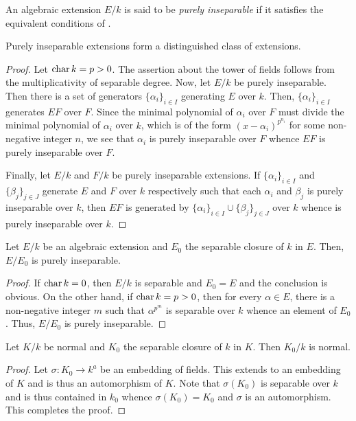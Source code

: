 \begin{definition}
    An algebraic extension $E/k$ is said to be \emph{purely inseparable} if it satisfies the equivalent conditions of .
\end{definition}

\begin{proposition}
    Purely inseparable extensions form a distinguished class of extensions.
\end{proposition}
\begin{proof}
    Let $\operatorname{char} k = p > 0$. The assertion about the tower of fields follows from the multiplicativity of separable degree. Now, let $E/k$ be purely inseparable. Then there is a set of generators $\{\alpha_i\}_{i\in I}$ generating $E$ over $k$. Then, $\{\alpha_i\}_{i\in I}$ generates $EF$ over $F$. Since the minimal polynomial of $\alpha_i$ over $F$ must divide the minimal polynomial of $\alpha_i$ over $k$, which is of the form $(x - \alpha_i)^{p^{n_i}}$ for some non-negative integer $n$, we see that $\alpha_i$ is purely inseparable over $F$ whence $EF$ is purely inseparable over $F$.

    Finally, let $E/k$ and $F/k$ be purely inseparable extensions. If $\{\alpha_i\}_{i\in I}$ and $\{\beta_j\}_{j\in J}$ generate $E$ and $F$ over $k$ respectively such that each $\alpha_i$ and $\beta_j$ is purely inseparable over $k$, then $EF$ is generated by $\{\alpha_i\}_{i\in I}\cup\{\beta_j\}_{j\in J}$ over $k$ whence is purely inseparable over $k$.
\end{proof}

\begin{proposition}
    Let $E/k$ be an algebraic extension and $E_0$ the separable closure of $k$ in $E$. Then, $E/E_0$ is purely inseparable.
\end{proposition}
\begin{proof}
    If $\operatorname{char} k = 0$, then $E/k$ is separable and $E_0 = E$ and the conclusion is obvious. On the other hand, if $\operatorname{char} k = p > 0$, then for every $\alpha\in E$, there is a non-negative integer $m$ such that $\alpha^{p^m}$ is separable over $k$ whence an element of $E_0$. Thus, $E/E_0$ is purely inseparable.
\end{proof}

\begin{proposition}
    Let $K/k$ be normal and $K_0$ the separable closure of $k$ in $K$. Then $K_0/k$ is normal.
\end{proposition}
\begin{proof}
    Let $\sigma: K_0\to k^a$ be an embedding of fields. This extends to an embedding of $K$ and is thus an automorphism of $K$. Note that $\sigma(K_0)$ is separable over $k$ and is thus contained in $k_0$ whence $\sigma(K_0) = K_0$ and $\sigma$ is an automorphism. This completes the proof.
\end{proof}

